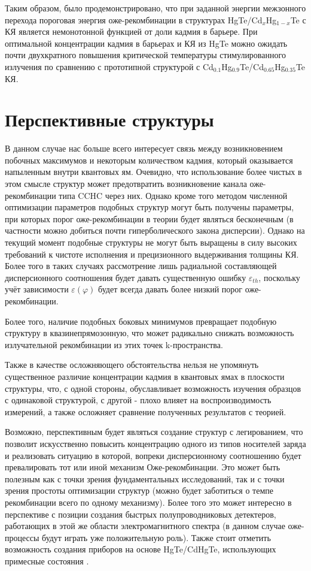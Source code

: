 \documentclass[../main.tex]{subfiles}
\begin{document}
    Таким образом, было продемонстрировано, что при заданной энергии межзонного перехода пороговая энергия оже-рекомбинации в структурах 
    HgTe/Cd${}_{x}$Hg${}_{1-x}$Te с КЯ является немонотонной функцией от доли кадмия в барьере. При оптимальной концентрации кадмия в барьерах и КЯ из HgTe 
    можно ожидать почти двухкратного повышения критической температуры стимулированного излучения по сравнению с прототипной структурой с 
    Cd${}_{0.1}$Hg${}_{0.9}$Te/Cd${}_{0.65}$Hg${}_{0.35}$Te КЯ.

    \section{Перспективные структуры}

    В данном случае нас больше всего интересует связь между возникновением побочных максимумов и некоторым количеством 
    кадмия, который оказывается напыленным внутри квантовых ям. Очевидно, что использование более чистых в этом смысле структур
    может предотвратить возникновение канала оже-рекомбинации типа CCHC через них. Однако кроме того методом численной оптимизации параметров 
    подобных структур могут быть получены параметры, при которых порог оже-рекомбинации в теории будет являться бесконечным (в частности можно добиться почти 
    гиперболического закона дисперсии). Однако на текущий момент подобные структуры не могут быть выращены в силу высоких требований к чистоте исполнения и 
    прецизионного выдерживания толщины КЯ. Более того в таких случаях рассмотрение лишь радиальной составляющей дисперсионного соотношения будет давать существенную ошибку $\varepsilon_{th}$,
    поскольку учёт зависимости $\varepsilon(\varphi)$ будет всегда давать более низкий порог оже-рекомбинации.

    Более того, наличие подобных боковых минимумов превращает подобную структуру в квазинепрямозонную, что может радикально снижать возможность излучательной 
    рекомбинации из этих точек k-пространства. 

    Также в качестве осложняющего обстоятельства нельзя не упомянуть существенное различие концентрации кадмия в квантовых ямах в плоскости структуры,
    что, с одной стороны, обуславливает возможность изучения образцов с одинаковой структурой, с другой - плохо влияет на воспроизводимость измерений,
    а также осложняет сравнение полученных результатов с теорией.

    Возможно, перспективным будет являться создание структур с легированием, что позволит искусственно повысить концентрацию одного из типов носителей заряда и реализовать 
    ситуацию в которой, вопреки дисперсионному соотношению будет превалировать тот или иной механизм Оже-рекомбинации. Это может быть полезным как с точки зрения 
    фундаментальных исследований, так и с точки зрения простоты оптимизации структур (можно будет заботиться о темпе рекомбинации всего по одному механизму). 
    Более того это может интересно в перспективе с позиции создания быстрых полупроводниковых детектеров, работающих в этой же области электромагнитного спектра 
    (в данном случае оже-процессы будут играть уже положительную роль). Также стоит отметить возможность создания приборов на основе HgTe/CdHgTe, использующих
    примесные состояния \cite{Kozlov:2019}.
\end{document}
